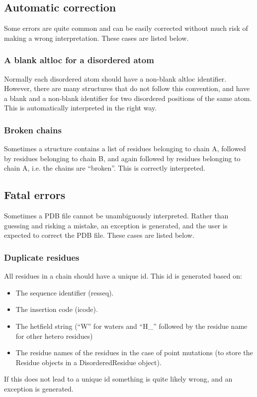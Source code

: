 \documentclass{report}
\begin{document}
\subsection{Automatic correction}

Some errors are quite common and can be easily corrected without much risk of
making a wrong interpretation. These cases are listed below.

\subsubsection{A blank altloc for a disordered atom}

Normally each disordered atom should have a non-blank altloc identifier. However,
there are many structures that do not follow this convention, and have a blank
and a non-blank identifier for two disordered positions of the same atom. This
is automatically interpreted in the right way.

\subsubsection{Broken chains}

Sometimes a structure contains a list of residues belonging to chain A, followed
by residues belonging to chain B, and again followed by residues belonging to
chain A, i.e. the chains are {}``broken{}''. This is correctly interpreted.

\subsection{Fatal errors}

Sometimes a PDB file cannot be unambiguously interpreted. Rather than guessing
and risking a mistake, an exception is generated, and the user is expected to
correct the PDB file. These cases are listed below.

\subsubsection{Duplicate residues}

All residues in a chain should have a unique id. This id is generated based
on:

\begin{itemize}
\item The sequence identifier (resseq).
\item The insertion code (icode).
\item The hetfield string ({}``W{}'' for waters and {}``H\_{}'' followed by the
residue name for other hetero residues)
\item The residue names of the residues in the case of point mutations (to store the
Residue objects in a DisorderedResidue object).
\end{itemize}
If this does not lead to a unique id something is quite likely wrong, and an
exception is generated.
\end{document}
